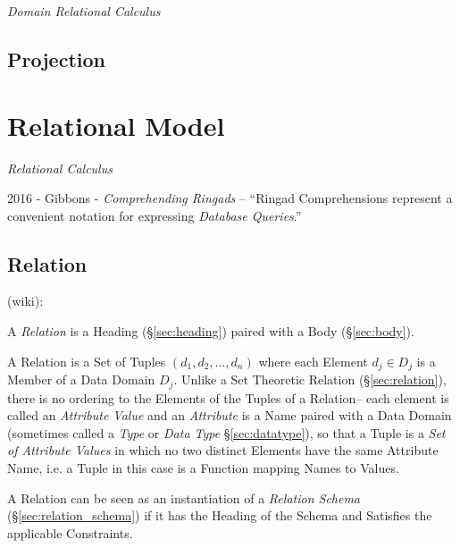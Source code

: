 \emph{Domain Relational Calculus}



\subsection{Projection}\label{sec:relational_projection}



\section{Relational Model}\label{sec:relational_model}

\emph{Relational Calculus}


2016 - Gibbons - \emph{Comprehending Ringads} -- ``Ringad Comprehensions
represent a convenient notation for expressing \emph{Database Queries}.''



\subsection{Relation}\label{sec:database_relation}

(wiki):

A \emph{Relation} is a Heading (\S\ref{sec:heading}) paired with a Body
(\S\ref{sec:body}).

A Relation is a Set of Tuples $(d_1, d_2, \ldots, d_n)$ where each Element $d_j
\in D_j$ is a Member of a Data Domain $D_j$. Unlike a Set Theoretic Relation
(\S\ref{sec:relation}), there is no ordering to the Elements of the Tuples of a
Relation-- each element is called an \emph{Attribute Value} and an
\emph{Attribute} is a Name paired with a Data Domain (sometimes called a
\emph{Type} or \emph{Data Type} \S\ref{sec:datatype}), so that a Tuple is a
\emph{Set of Attribute Values} in which no two distinct Elements have the same
Attribute Name, i.e. a Tuple in this case is a Function mapping Names to
Values.

A Relation can be seen as an instantiation of a \emph{Relation Schema}
(\S\ref{sec:relation_schema}) if it has the Heading of the Schema and Satisfies
the applicable Constraints.


